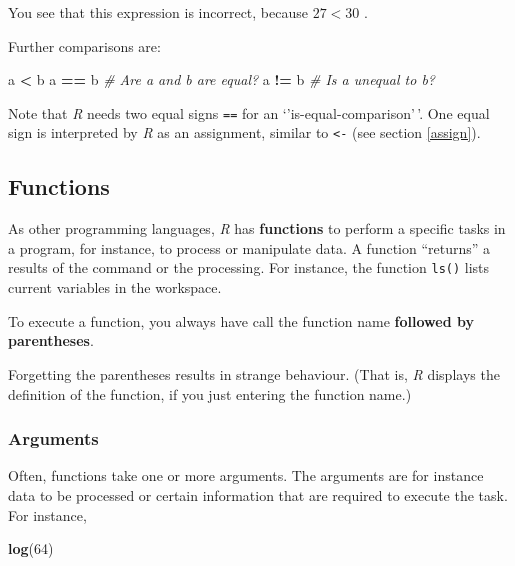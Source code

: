 \documentclass[
]{scrartcl}
\makeatletter
\newenvironment{Shaded}{\begin{snugshade}}{\end{snugshade}}
\newcommand{\CommentTok}[1]{\textcolor[rgb]{0.56,0.35,0.01}{\textit{#1}}}
\newcommand{\DecValTok}[1]{\textcolor[rgb]{0.00,0.00,0.81}{#1}}
\newcommand{\FunctionTok}[1]{\textcolor[rgb]{0.13,0.29,0.53}{\textbf{#1}}}
\newcommand{\NormalTok}[1]{#1}
\newcommand{\SpecialCharTok}[1]{\textcolor[rgb]{0.81,0.36,0.00}{\textbf{#1}}}
\newenvironment{kframe}{%
\medskip{}
\setlength{\fboxsep}{.8em}
 \def\at@end@of@kframe{}%
 \ifinner\ifhmode%
  \def\at@end@of@kframe{\end{minipage}}%
  \begin{minipage}{\columnwidth}%
 \fi\fi%
 \def\FrameCommand##1{\hskip\@totalleftmargin \hskip-\fboxsep
 \colorbox{shadecolor}{##1}\hskip-\fboxsep
     \hskip-\linewidth \hskip-\@totalleftmargin \hskip\columnwidth}%
 \MakeFramed {\advance\hsize-\width
   \@totalleftmargin\z@ \linewidth\hsize
   \@setminipage}}%
 {\par\unskip\endMakeFramed%
 \at@end@of@kframe}
\newenvironment{rmdblock}[1]
  {
  \begin{itemize}
  \renewcommand{\labelitemi}{
    \raisebox{-.7\height}[0pt][0pt]{
      {\setkeys{Gin}{width=3em,keepaspectratio}\texttt{[image: images/\#1]}}
    }
  }
  \setlength{\fboxsep}{1em}
  \begin{kframe}
  \item
  }
  {
  \end{kframe}
  \end{itemize}
  }
\newenvironment{important}
    {\begin{rmdblock}{hint}}
    {\end{rmdblock}}
\makeatother
\begin{document}
You see that this expression is incorrect, because \(27<30\) .

Further comparisons are:

\begin{Shaded}
\begin{Highlighting}[]
\NormalTok{a }\SpecialCharTok{\textless{}}\NormalTok{ b}
\NormalTok{a }\SpecialCharTok{==}\NormalTok{ b   }\CommentTok{\# Are a and b are equal?}
\NormalTok{a }\SpecialCharTok{!=}\NormalTok{ b   }\CommentTok{\# Is a unequal to b?}
\end{Highlighting}
\end{Shaded}

Note that \emph{R} needs two equal signs \texttt{==} for an `'is-equal-comparison'\,'. One equal sign is interpreted by \emph{R} as an assignment, similar to \texttt{\textless{}-} (see section \ref{assign}).

\subsection{Functions}\label{functions}

As other programming languages, \emph{R} has \textbf{functions} to perform a specific tasks in a program, for instance, to process or manipulate data. A function ``returns'' a results of the command or the processing. For instance, the function \texttt{ls()} lists current variables in the workspace.

\begin{important}
To execute a function, you always have call the function name
\textbf{followed by parentheses}.

Forgetting the parentheses results in strange behaviour. (That is,
\emph{R} displays the definition of the function, if you just entering
the function name.)
\end{important}

\subsubsection{Arguments}\label{arguments}

Often, functions take one or more arguments. The arguments are for instance data to be processed or certain information that are required to execute the task. For instance,

\begin{Shaded}
\begin{Highlighting}[]
\FunctionTok{log}\NormalTok{(}\DecValTok{64}\NormalTok{)}
\end{Highlighting}
\end{Shaded}
\end{document}
